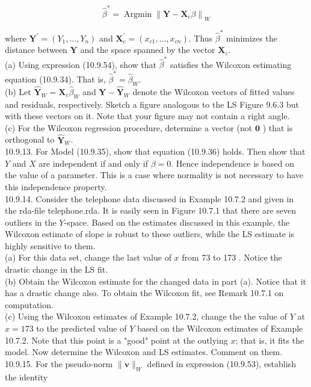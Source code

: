 $$
\widehat{\beta}^{*}=\operatorname{Argmin}\left\|\mathbf{Y}-\mathbf{X}_{c} \beta\right\|_{W}
$$

where $\mathbf{Y}^{\prime}=\left(Y_{1}, \ldots, Y_{n}\right)$ and $\mathbf{X}_{c}^{\prime}=\left(x_{c 1}, \ldots, x_{c n}\right)$. Thus $\widehat{\beta}^{*}$ minimizes the distance between $\mathbf{Y}$ and the space spanned by the vector $\mathbf{X}_{c}$.\\
(a) Using expression (10.9.54), show that $\widehat{\beta}^{*}$ satisfies the Wilcoxon estimating equation (10.9.34). That is, $\widehat{\beta}^{*}=\widehat{\beta}_{W}$.\\
(b) Let $\widehat{\mathbf{Y}}_{W}=\mathbf{X}_{c} \widehat{\beta}_{W}$ and $\mathbf{Y}-\widehat{\mathbf{Y}}_{W}$ denote the Wilcoxon vectors of fitted values and residuals, respectively. Sketch a figure analogous to the LS Figure 9.6.3 but with these vectors on it. Note that your figure may not contain a right angle.\\
(c) For the Wilcoxon regression procedure, determine a vector (not $\mathbf{0}$ ) that is orthogonal to $\widehat{\mathbf{Y}}_{W}$.\\
10.9.13. For Model (10.9.35), show that equation (10.9.36) holds. Then show that $Y$ and $X$ are independent if and only if $\beta=0$. Hence independence is based on the value of a parameter. This is a case where normality is not necessary to have this independence property.\\
10.9.14. Consider the telephone data discussed in Example 10.7.2 and given in the rda-file telephone.rda. It is easily seen in Figure 10.7.1 that there are seven outliers in the $Y$-space. Based on the estimates discussed in this example, the Wilcoxon estimate of slope is robust to these outliers, while the LS estimate is highly sensitive to them.\\
(a) For this data set, change the last value of $x$ from 73 to 173 . Notice the drastic change in the LS fit.\\
(b) Obtain the Wilcoxon estimate for the changed data in part (a). Notice that it has a drastic change also. To obtain the Wilcoxon fit, see Remark 10.7.1 on computation.\\
(c) Using the Wilcoxon estimates of Example 10.7.2, change the the value of $Y$ at $x=173$ to the predicted value of $Y$ based on the Wilcoxon estimates of Example 10.7.2. Note that this point is a "good" point at the outlying $x$; that is, it fits the model. Now determine the Wilcoxon and LS estimates. Comment on them.\\
10.9.15. For the pseudo-norm $\|\mathbf{v}\|_{W}$ defined in expression (10.9.53), establish the identity


